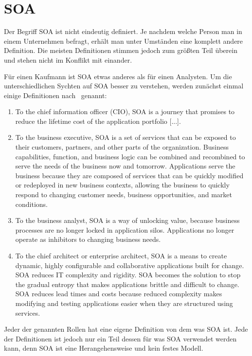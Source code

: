 \chapter{SOA}
\label{chap:soa}
Der Begriff SOA ist nicht eindeutig definiert. Je nachdem welche Person man in einem Unternehmen befragt, erhält man unter Umständen eine komplett andere Definition. \frqq Die meisten Definitionen stimmen jedoch zum größten Teil überein und stehen nicht im Konflikt mit einander.\flqq\cite[vgl. Seite 6]{100QA}

Für einen Kaufmann ist SOA etwas anderes als für einen Analysten. Um die unterschiedlichen Sychten auf SOA besser zu verstehen, werden zunächst einmal einige Definitionen nach \cite{100QA}\ genannt:
\begin{enumerate}
       \item \frqq To the chief information officer (CIO), SOA is a journey that
       promises to reduce the lifetime cost of the application portfolio [...].\flqq \cite[vgl. Seite 6]{100QA}
    
       \item \frqq To the business executive, SOA is a set of services that can be exposed to their customers, partners, and other parts of the organization. Business capabilities, function, and business logic can be combined and recombined to serve the needs of the business now and tomorrow. Applications serve the business because they are composed
       of services that can be quickly modified or redeployed in new
       business contexts, allowing the business to quickly respond to changing
       customer needs, business opportunities, and market conditions.\flqq \cite[vgl. Seite 6]{100QA}
       
       \item \frqq To the business analyst, SOA is a way of unlocking value, because business processes are no longer locked in application silos. Applications no longer operate as inhibitors to changing business needs.\flqq \cite[vgl. Seite 6]{100QA}
       
       \item \frqq To the chief architect or enterprise architect, SOA is a means to
       create dynamic, highly configurable and collaborative applications
       built for change. SOA reduces IT complexity and rigidity. SOA becomes the solution to stop the gradual entropy that makes applications
       brittle and difficult to change. SOA reduces lead times and costs
       because reduced complexity makes modifying and testing applications
       easier when they are structured using services.\flqq \cite[vgl. Seite ]{100QA}
\end{enumerate}
Jeder der genannten Rollen hat eine eigene Definition von dem was SOA ist. Jede der Definitionen ist jedoch nur ein Teil dessen für was SOA verwendet werden kann, denn SOA ist eine Herangehensweise und kein festes Modell.

